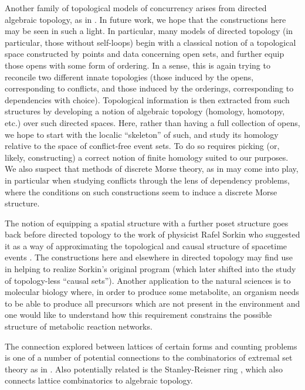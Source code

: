 \documentclass[hoptionsi,review,screen,format=sigconf]{acmart}
\theoremstyle{definition}
\begin{document}
Another family of topological models of concurrency arises from directed algebraic topology, as in \cite{fajstrup2016directed}. In future work, we hope that the constructions here may be seen in such a light. In particular, many models of directed topology (in particular, those without self-loops) begin with a classical notion of a topological space constructed by points and data concerning open sets, and further equip those opens with some form of ordering. In a sense, this is again trying to reconcile two different innate topologies (those induced by the opens, corresponding to conflicts, and those induced by the orderings, corresponding to dependencies with choice). Topological information is then extracted from such structures by developing a notion of algebraic topology (homology, homotopy, etc.) over such directed spaces. Here, rather than having a full collection of opens, we hope to start with the localic ``skeleton'' of such, and study its homology relative to the space of conflict-free event sets. To do so requires picking (or, likely, constructing) a correct notion of finite homology suited to our purposes. We also suspect that methods of discrete Morse theory, as in \cite{forman2002user} may come into play, in particular when studying conflicts through the lens of dependency problems, where the conditions on such constructions seem to induce a discrete Morse structure.

The notion of equipping a spatial structure with a further poset structure goes back before
directed topology to the work of physicist Rafel Sorkin who suggested it as a way of approximating the
topological and causal structure of spacetime events \cite{sorkin1983posets}.  The constructions here and elsewhere in directed
topology may find use in helping to realize Sorkin’s original program (which later shifted into the study of topology-less ``causal sets'').  Another application to the natural sciences is to molecular biology where, in order to produce some metabolite, an organism needs to be able to produce
all precursors which are not present in the environment and one would like to understand how this requirement
constrains the possible structure of metabolic reaction networks.

The connection explored between lattices of certain forms and counting problems is one of a number of potential connections to the combinatorics of extremal set theory as in \cite{stanley2013algebraic}. Also potentially related is the Stanley-Reisner ring \cite{francisco2014survey}, which also connects lattice combinatorics to algebraic topology.
\end{document}
